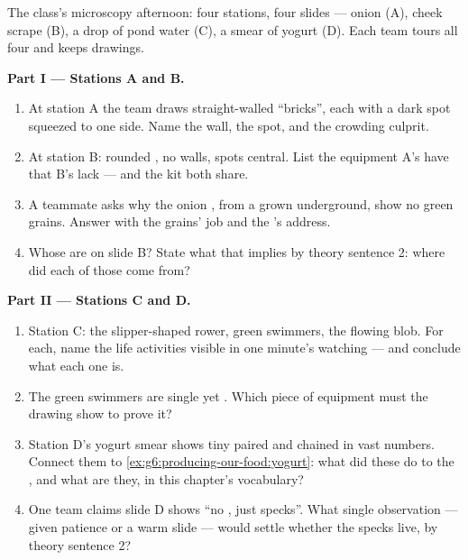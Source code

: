 \begin{problem}\label{pb:g6:cell-unit-of-life:1}
The class's microscopy afternoon: four stations, four
slides --- onion  (A), cheek scrape (B), a drop of
pond water (C), a smear of yogurt (D). Each team tours all
four and keeps drawings.

\medskip\noindent\textbf{Part I --- Stations A and B.}
\begin{enumerate}
  \item At station A the team draws straight-walled
        ``bricks'', each with a dark spot squeezed to one
        side. Name the wall, the spot, and the crowding
        culprit.
  \item At station B: rounded , no walls, spots
        central. List the equipment A's  have that
        B's lack --- and the kit both share.
  \item A teammate asks why the onion , from a 
        grown underground, show no green grains. Answer
        with the grains' job and the 's address.
  \item Whose  are on slide B? State what that
        implies by  theory sentence 2: where did each
        of those  come from?
\end{enumerate}

\medskip\noindent\textbf{Part II --- Stations C and D.}
\begin{enumerate}[resume]
  \item Station C: the slipper-shaped rower, green
        swimmers, the flowing blob. For each, name the
        life activities visible in one minute's watching
        --- and conclude what each one is.
  \item The green swimmers are single  yet
        . Which piece of equipment must the
        drawing show to prove it?
  \item Station D's yogurt smear shows tiny paired and
        chained  in vast numbers. Connect them to
        \cref{ex:g6:producing-our-food:yogurt}: what did
        these  do to the , and what are they, in
        this chapter's vocabulary?
  \item One team claims slide D shows ``no , just specks''. What single observation
        --- given patience or a warm slide --- would
        settle whether the specks live, by  theory
        sentence 2?
\end{enumerate}


\end{problem}

